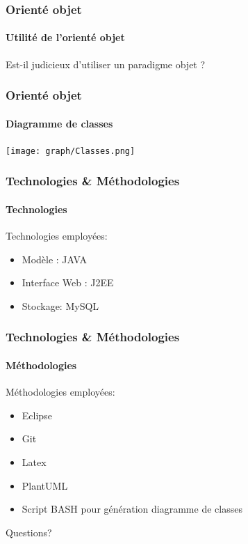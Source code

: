 \documentclass{beamer}
\begin{document}
    \begin{frame}
        \frametitle{Orient\'e objet}
        \framesubtitle{Utilit\'e de l'orient\'e objet}
        Est-il judicieux d'utiliser un paradigme objet ?
    \end{frame}
    \begin{frame}
        \frametitle{Orient\'e objet}
        \framesubtitle{Diagramme de classes}
        \texttt{[image: graph/Classes.png]}
    \end{frame}

    \begin{frame}
        \frametitle{Technologies \& Méthodologies}
        \framesubtitle{Technologies}
        Technologies employées:
        \begin{itemize}
            \item Modèle : JAVA
            \item Interface Web : J2EE
            \item Stockage: MySQL
        \end{itemize}
    \end{frame}
    \begin{frame}
        \frametitle{Technologies \& Méthodologies}
        \framesubtitle{Méthodologies}
        Méthodologies employées:
        \begin{itemize}
            \item Eclipse
            \item Git
            \item Latex
            \item PlantUML
            \item Script BASH pour génération diagramme de classes
        \end{itemize}
    \end{frame}

    \begin{frame}
        \begin{center}
            Questions?
        \end{center}
    \end{frame}
\end{document}
